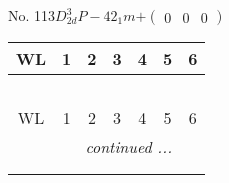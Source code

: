 \documentclass[fleqn,9pt,landscape]{jsarticle}
\begin{document}
\newpage
No. 113\quad$D_{2d}^{3}$\quad$P-42_1m$\quad[ tetragonal ]\quad$+\begin{pmatrix} 0 & 0 & 0 \end{pmatrix}$
\begin{center}
\renewcommand{\arraystretch}{1.2}
\begin{longtable}{ccccccc}
 \hline \hline
WL & 1 & 2 & 3 & 4 & 5 & 6 \\ \hline \endfirsthead

\multicolumn{6}{l}{\tablename\ \thetable{}} \\
 \hline \hline
WL & 1 & 2 & 3 & 4 & 5 & 6 \\ \hline \endhead

 \hline \hline
\multicolumn{6}{r}{\footnotesize\it continued ...} \\ \endfoot

 \hline \hline
\multicolumn{6}{r}{} \\ \endlastfoot


\end{longtable}
\end{center}
\end{document}
